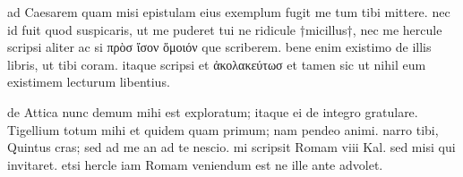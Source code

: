 


 ad Caesarem quam misi epistulam eius exemplum fugit me tum tibi mittere. nec id fuit quod suspicaris, ut me puderet tui ne ridicule †micillus†, nec me hercule scripsi aliter ac si πρὸσ ἴσον ὅμοιόν que scriberem. bene enim existimo de illis libris, ut tibi coram. itaque scripsi et ἀκολακεύτωσ et tamen sic ut nihil eum existimem lecturum libentius.

 de Attica nunc demum mihi est exploratum; itaque ei de integro gratulare. Tigellium totum mihi et quidem quam primum; nam pendeo animi. narro tibi, Quintus cras; sed ad me an ad te nescio. mi scripsit Romam viii Kal. sed misi qui invitaret. etsi hercle iam Romam veniendum est ne ille ante advolet.
